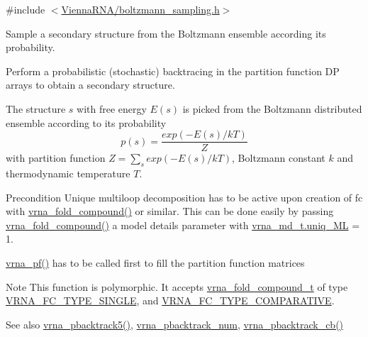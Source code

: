 {\ttfamily \#include $<$\mbox{\hyperlink{boltzmann__sampling_8h}{Vienna\+R\+N\+A/boltzmann\+\_\+sampling.\+h}}$>$}



Sample a secondary structure from the Boltzmann ensemble according its probability. 

Perform a probabilistic (stochastic) backtracing in the partition function DP arrays to obtain a secondary structure.

The structure $ s $ with free energy $ E(s) $ is picked from the Boltzmann distributed ensemble according to its probability \[ p(s) = \frac{exp(-E(s) / kT)}{Z} \] with partition function $ Z = \sum_s exp(-E(s) / kT) $, Boltzmann constant $ k $ and thermodynamic temperature $ T $.

\begin{DoxyPrecond}{Precondition}
Unique multiloop decomposition has to be active upon creation of {\ttfamily fc} with \mbox{\hyperlink{group__fold__compound_ga6601d994ba32b11511b36f68b08403be}{vrna\+\_\+fold\+\_\+compound()}} or similar. This can be done easily by passing \mbox{\hyperlink{group__fold__compound_ga6601d994ba32b11511b36f68b08403be}{vrna\+\_\+fold\+\_\+compound()}} a model details parameter with \mbox{\hyperlink{group__model__details_ade065b814a4e2e72ead93ab502613ed2}{vrna\+\_\+md\+\_\+t.\+uniq\+\_\+\+ML}} = 1. 

\mbox{\hyperlink{group__part__func__global_ga29e256d688ad221b78d37f427e0e99bc}{vrna\+\_\+pf()}} has to be called first to fill the partition function matrices
\end{DoxyPrecond}
\begin{DoxyNote}{Note}
This function is polymorphic. It accepts \mbox{\hyperlink{group__fold__compound_ga1b0cef17fd40466cef5968eaeeff6166}{vrna\+\_\+fold\+\_\+compound\+\_\+t}} of type \mbox{\hyperlink{group__fold__compound_gga01a4ff86fa71deaaa5d1abbd95a1447da7e264dd3cf2dc9b6448caabcb7763cd6}{V\+R\+N\+A\+\_\+\+F\+C\+\_\+\+T\+Y\+P\+E\+\_\+\+S\+I\+N\+G\+LE}}, and \mbox{\hyperlink{group__fold__compound_gga01a4ff86fa71deaaa5d1abbd95a1447dab821ce46ea3cf665be97df22a76f5023}{V\+R\+N\+A\+\_\+\+F\+C\+\_\+\+T\+Y\+P\+E\+\_\+\+C\+O\+M\+P\+A\+R\+A\+T\+I\+VE}}.
\end{DoxyNote}
\begin{DoxySeeAlso}{See also}
\mbox{\hyperlink{group__subopt__stochbt_ga72ebbe45bcbce147a12f27f62b38db78}{vrna\+\_\+pbacktrack5()}}, \mbox{\hyperlink{group__subopt__stochbt_ga596ed9bcd86f629a7c7c59c58b297db5}{vrna\+\_\+pbacktrack\+\_\+num}}, \mbox{\hyperlink{group__subopt__stochbt_ga843fa953a15337b15cc68401adad84d7}{vrna\+\_\+pbacktrack\+\_\+cb()}}
\end{DoxySeeAlso}

